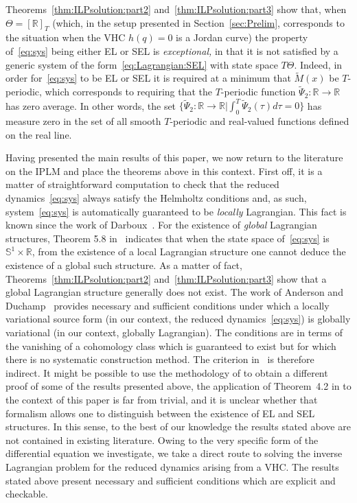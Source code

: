 \begin{remark}\label{rem:exceptionality}
	Theorems~\ref{thm:ILPsolution:part2} and~\ref{thm:ILPsolution:part3}
	show that, when $\Theta = [\mathbb{R}]_T$ (which, in the setup presented in
	Section~\ref{sec:Prelim}, corresponds to the situation when the VHC
	$h(q)=0$ is a Jordan curve) the property of~\eqref{eq:sys} being
	either EL or SEL is {\em exceptional,} in that it is not satisfied by
	a generic system of the form~\eqref{eq:Lagrangian:SEL} with state
	space $T\Theta$. Indeed, in order for~\eqref{eq:sys} to be EL or SEL
	it is required at a minimum that $\tilde M(x)$ be $T$-periodic, which
	corresponds to requiring that the $T$-periodic function $\tilde
	\Psi_2:\mathbb{R} \to \mathbb{R}$ has zero average. In other words, the set
	$\{\tilde{\Psi}_2:\mathbb{R}\to\mathbb{R}| \int_0^T\tilde{\Psi}_2(\tau)d\tau=0\}$
	has measure zero in the set of all smooth $T$-periodic and real-valued
	functions defined on the real line.
\end{remark}
\begin{remark}\label{rem:lit}
	Having presented the main results of this paper, we now return to the
	literature on the IPLM and place the theorems above in this
	context. First off, it is a matter of straightforward computation to
	check that the reduced dynamics~\eqref{eq:sys} always satisfy the
	Helmholtz conditions and, as such, system~\eqref{eq:sys} is
	automatically guaranteed to be {\em locally} Lagrangian. This fact is
	known since the work of Darboux~\cite{Darboux-1894}. For the existence
	of {\em global} Lagrangian structures, Theorem 5.8
	in~\cite{Takens-1979} indicates that when the state space
	of~\eqref{eq:sys} is $\mathbb{S}^1 \times \mathbb{R}$, from the existence of a local
	Lagrangian structure one cannot deduce the existence of a global such
	structure. As a matter of fact, Theorems~\ref{thm:ILPsolution:part2}
	and~\ref{thm:ILPsolution:part3} show that a global Lagrangian
	structure generally does not exist. The work of Anderson and
	Duchamp~\cite[Theorem~4.2]{Anderson-1980} provides necessary and
	sufficient conditions under which a locally variational source form
	(in our context, the reduced dynamics~\eqref{eq:sys}) is globally
	variational (in our context, globally Lagrangian). The conditions are
	in terms of the vanishing of a cohomology class which is guaranteed to
	exist but for which there is no systematic construction method. The
	criterion in~\cite{Anderson-1980} is therefore indirect.  It might be
	possible to use the methodology of \cite{Anderson-1980} to obtain a
	different proof of some of the results presented above, the
	application of Theorem~4.2 in \cite{Anderson-1980} to the context of
	this paper is far from trivial, and it is unclear whether that
	formalism allows one to distinguish between the existence of EL and
	SEL structures.  In this sense, to the best of our knowledge the
	results stated above are not contained in existing literature. Owing
	to the very specific form of the differential equation we investigate,
	we take a direct route to solving the inverse Lagrangian problem for
	the reduced dynamics arising from a VHC. The results stated above
	present necessary and sufficient conditions which are explicit and
	checkable.
\end{remark}

